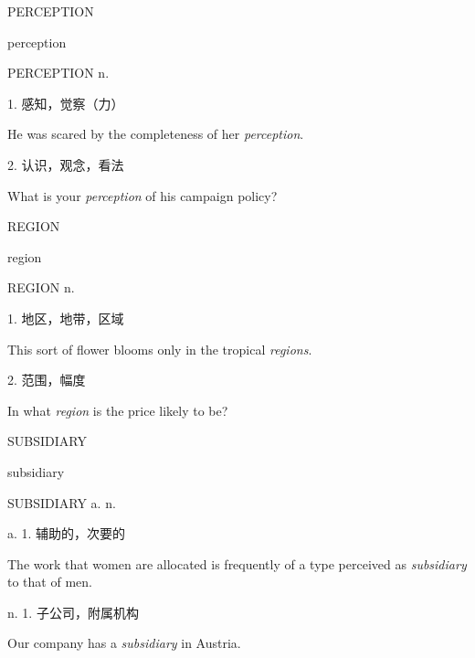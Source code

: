 \begin{flashcard}{
PERCEPTION

perception
}
\begin{center}
PERCEPTION n. 
\end{center}
1. 感知，觉察（力）

He was scared by the completeness of her \textit{perception}.

2. 认识，观念，看法

What is your \textit{perception} of his campaign policy?

\end{flashcard}
\begin{flashcard}{
REGION

region
}
\begin{center}
REGION n. 
\end{center}
1. 地区，地带，区域

This sort of flower blooms only in the tropical \textit{regions}.

2. 范围，幅度

In what \textit{region} is the price likely to be?

\end{flashcard}
\begin{flashcard}{
SUBSIDIARY

subsidiary
}
\begin{center}
SUBSIDIARY a. n. 
\end{center}
a. 1. 辅助的，次要的

The work that women are allocated is frequently of a type perceived as \textit{subsidiary} to that of men.

n. 1. 子公司，附属机构

Our company has a \textit{subsidiary} in Austria.

\end{flashcard}
